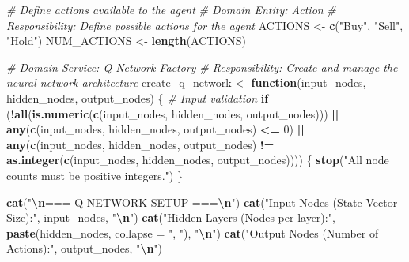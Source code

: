 \documentclass[
]{article}
\newenvironment{Shaded}{\begin{snugshade}}{\end{snugshade}}
\newcommand{\AttributeTok}[1]{\textcolor[rgb]{0.13,0.29,0.53}{#1}}
\newcommand{\CommentTok}[1]{\textcolor[rgb]{0.56,0.35,0.01}{\textit{#1}}}
\newcommand{\ControlFlowTok}[1]{\textcolor[rgb]{0.13,0.29,0.53}{\textbf{#1}}}
\newcommand{\DecValTok}[1]{\textcolor[rgb]{0.00,0.00,0.81}{#1}}
\newcommand{\FunctionTok}[1]{\textcolor[rgb]{0.13,0.29,0.53}{\textbf{#1}}}
\newcommand{\NormalTok}[1]{#1}
\newcommand{\OtherTok}[1]{\textcolor[rgb]{0.56,0.35,0.01}{#1}}
\newcommand{\SpecialCharTok}[1]{\textcolor[rgb]{0.81,0.36,0.00}{\textbf{#1}}}
\newcommand{\StringTok}[1]{\textcolor[rgb]{0.31,0.60,0.02}{#1}}
\begin{document}
\begin{Shaded}
\begin{Highlighting}[]
\CommentTok{\# Define actions available to the agent}
\CommentTok{\# Domain Entity: Action}
\CommentTok{\# Responsibility: Define possible actions for the agent}
\NormalTok{ACTIONS }\OtherTok{\textless{}{-}} \FunctionTok{c}\NormalTok{(}\StringTok{"Buy"}\NormalTok{, }\StringTok{"Sell"}\NormalTok{, }\StringTok{"Hold"}\NormalTok{)}
\NormalTok{NUM\_ACTIONS }\OtherTok{\textless{}{-}} \FunctionTok{length}\NormalTok{(ACTIONS)}

\CommentTok{\# Domain Service: Q{-}Network Factory}
\CommentTok{\# Responsibility: Create and manage the neural network architecture}
\NormalTok{create\_q\_network }\OtherTok{\textless{}{-}} \ControlFlowTok{function}\NormalTok{(input\_nodes, hidden\_nodes, output\_nodes) \{}
  \CommentTok{\# Input validation}
  \ControlFlowTok{if}\NormalTok{ (}\SpecialCharTok{!}\FunctionTok{all}\NormalTok{(}\FunctionTok{is.numeric}\NormalTok{(}\FunctionTok{c}\NormalTok{(input\_nodes, hidden\_nodes, output\_nodes))) }\SpecialCharTok{||}
      \FunctionTok{any}\NormalTok{(}\FunctionTok{c}\NormalTok{(input\_nodes, hidden\_nodes, output\_nodes) }\SpecialCharTok{\textless{}=} \DecValTok{0}\NormalTok{) }\SpecialCharTok{||}
      \FunctionTok{any}\NormalTok{(}\FunctionTok{c}\NormalTok{(input\_nodes, hidden\_nodes, output\_nodes) }\SpecialCharTok{!=} \FunctionTok{as.integer}\NormalTok{(}\FunctionTok{c}\NormalTok{(input\_nodes, hidden\_nodes, output\_nodes)))) \{}
    \FunctionTok{stop}\NormalTok{(}\StringTok{"All node counts must be positive integers."}\NormalTok{)}
\NormalTok{  \}}
  
  \FunctionTok{cat}\NormalTok{(}\StringTok{"}\SpecialCharTok{\textbackslash{}n}\StringTok{=== Q{-}NETWORK SETUP ===}\SpecialCharTok{\textbackslash{}n}\StringTok{"}\NormalTok{)}
  \FunctionTok{cat}\NormalTok{(}\StringTok{"Input Nodes (State Vector Size):"}\NormalTok{, input\_nodes, }\StringTok{"}\SpecialCharTok{\textbackslash{}n}\StringTok{"}\NormalTok{)}
  \FunctionTok{cat}\NormalTok{(}\StringTok{"Hidden Layers (Nodes per layer):"}\NormalTok{, }\FunctionTok{paste}\NormalTok{(hidden\_nodes, }\AttributeTok{collapse =} \StringTok{", "}\NormalTok{), }\StringTok{"}\SpecialCharTok{\textbackslash{}n}\StringTok{"}\NormalTok{)}
  \FunctionTok{cat}\NormalTok{(}\StringTok{"Output Nodes (Number of Actions):"}\NormalTok{, output\_nodes, }\StringTok{"}\SpecialCharTok{\textbackslash{}n}\StringTok{"}\NormalTok{)}
  

\end{Highlighting}
\end{Shaded}
\end{document}
